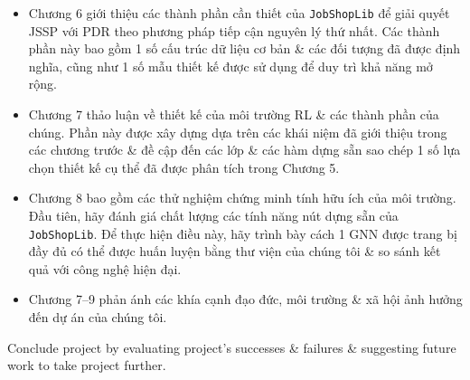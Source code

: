 \documentclass{article}
\begin{document}
\begin{itemize}
\begin{itemize}
\begin{itemize}
            \begin{itemize}
                \item Chương 6 giới thiệu các thành phần cần thiết của {\tt JobShopLib} để giải quyết JSSP với PDR theo phương pháp tiếp cận nguyên lý thứ nhất. Các thành phần này bao gồm 1 số cấu trúc dữ liệu cơ bản \& các đối tượng đã được định nghĩa, cũng như 1 số mẫu thiết kế được sử dụng để duy trì khả năng mở rộng.
                \item Chương 7 thảo luận về thiết kế của môi trường RL \& các thành phần của chúng. Phần này được xây dựng dựa trên các khái niệm đã giới thiệu trong các chương trước \& đề cập đến các lớp \& các hàm dựng sẵn sao chép 1 số lựa chọn thiết kế cụ thể đã được phân tích trong Chương 5.
                \item Chương 8 bao gồm các thử nghiệm chứng minh tính hữu ích của môi trường. Đầu tiên, hãy đánh giá chất lượng các tính năng nút dựng sẵn của {\tt JobShopLib}. Để thực hiện điều này, hãy trình bày cách 1 GNN được trang bị đầy đủ có thể được huấn luyện bằng thư viện của chúng tôi \& so sánh kết quả với công nghệ hiện đại.
                \item Chương 7--9 phản ánh các khía cạnh đạo đức, môi trường \& xã hội ảnh hưởng đến dự án của chúng tôi.
            \end{itemize}
        \end{itemize}
        Conclude project by evaluating project's successes \& failures \& suggesting future work to take project further.


\end{itemize}
\end{itemize}
\end{document}
